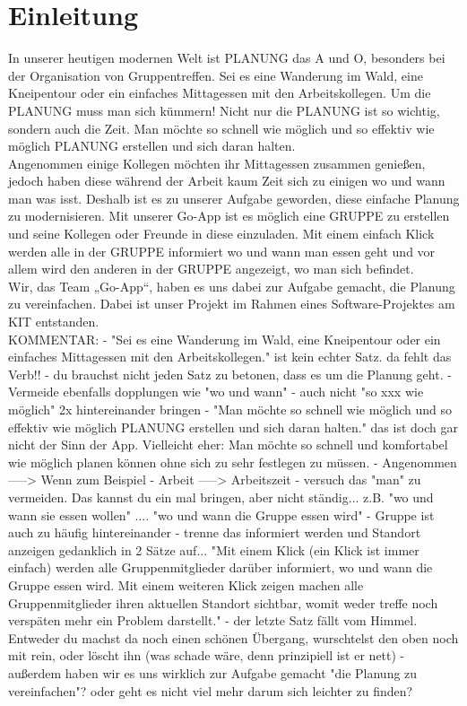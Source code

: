 \section{Einleitung}
In unserer heutigen modernen Welt ist PLANUNG das A und O, besonders bei der Organisation von Gruppentreffen. Sei es eine Wanderung im Wald, eine Kneipentour oder ein einfaches Mittagessen mit den Arbeitskollegen. Um die PLANUNG muss man sich kümmern! Nicht nur die PLANUNG ist so wichtig, sondern auch die Zeit. Man möchte so schnell wie möglich und so effektiv wie möglich PLANUNG erstellen und sich daran halten. \\
Angenommen einige Kollegen möchten ihr Mittagessen zusammen genießen, jedoch haben diese während der Arbeit kaum Zeit sich zu einigen wo  und wann man was isst. Deshalb ist es zu unserer Aufgabe geworden, diese einfache Planung zu modernisieren. Mit unserer Go-App ist es möglich eine GRUPPE zu erstellen und seine Kollegen oder Freunde in diese einzuladen. Mit einem einfach Klick werden alle in der GRUPPE informiert wo und wann man essen geht und vor allem wird den anderen in der GRUPPE angezeigt, wo man sich befindet. \\
Wir, das Team „Go-App“, haben es uns dabei zur Aufgabe gemacht, die Planung zu vereinfachen. Dabei ist unser Projekt im Rahmen eines Software-Projektes am KIT entstanden. \\

KOMMENTAR:
- "Sei es eine Wanderung im Wald, eine Kneipentour oder ein einfaches Mittagessen mit den Arbeitskollegen." ist kein echter Satz. da fehlt das Verb!!
- du brauchst nicht jeden Satz zu betonen, dass es um die Planung geht.
- Vermeide ebenfalls dopplungen wie "wo und wann"
- auch nicht "so xxx wie möglich"  2x hintereinander bringen 
- "Man möchte so schnell wie möglich und so effektiv wie möglich PLANUNG erstellen und sich daran halten." das ist doch gar nicht der Sinn der App. Vielleicht eher: Man möchte so schnell und komfortabel 	wie möglich planen können ohne sich zu sehr festlegen zu müssen.
- Angenommen    -----> Wenn zum Beispiel
- Arbeit        -----> Arbeitszeit
- versuch das "man" zu vermeiden. Das kannst du ein mal bringen, aber nicht ständig... z.B. "wo und wann sie essen wollen"     .... "wo und wann die Gruppe essen wird"
- Gruppe ist auch zu häufig hintereinander
- trenne das informiert werden und Standort anzeigen gedanklich in 2 Sätze auf... "Mit einem Klick (ein Klick ist immer einfach) werden alle Gruppenmitglieder darüber informiert, wo und wann die Gruppe essen wird. Mit einem weiteren Klick zeigen machen alle Gruppenmitglieder ihren aktuellen Standort sichtbar, womit weder treffe noch verspäten mehr ein Problem darstellt."
- der letzte Satz fällt vom Himmel. Entweder du machst da noch einen schönen Übergang, wurschtelst den oben noch mit rein, oder löscht ihn (was schade wäre, denn prinzipiell ist er nett)
- außerdem haben wir es uns wirklich zur Aufgabe gemacht "die Planung zu vereinfachen"? oder geht es nicht viel mehr darum sich leichter zu finden?
